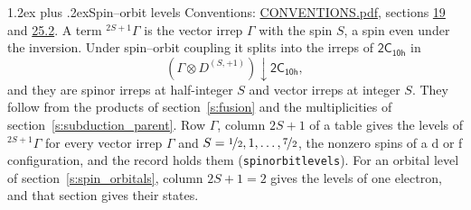 \documentclass[10pt,a4paper]{article}
\makeatletter
\renewcommand\section{\@startsection{section}{1}{\z@}{-3ex plus -1ex minus -.2ex}%
  {1.2ex plus .2ex}{\normalfont\large\sffamily\bfseries\color{parttitle}}}
\numberwithin{equation}{section}
\newcommand{\grp}[1]{\mathsf{#1}}
\newcommand{\restr}[2]{#1\!\downarrow#2}
\newcommand{\irrJp}[2]{D^{(#1,#2)}}
\newcommand{\irrprod}{\otimes}
\newcommand{\term}[2]{{}^{#1}#2}
\makeatother
\begin{document}
\section{Spin--orbit levels}\label{s:spin_orbit}
Conventions: \href{../../CONVENTIONS.pdf}{CONVENTIONS.pdf}, sections \href{../../../rotation/CONVENTIONS.pdf\#conv.19}{19} and \href{../../CONVENTIONS.pdf\#conv.25.2}{25.2}.
\leavevmode\label{n:local.spin}\label{n:symbol.term}A term $\term{2S+1}{\Gamma}$ is the vector irrep $\Gamma$ with the spin $S$, a spin even under the inversion. Under spin--orbit coupling it splits into the irreps of $\grp{2C_{10h}}$ in
\begin{equation}\label{e:spinorbit}\restr{(\Gamma \irrprod \irrJp{S}{+1})}{\grp{2C_{10h}}},\end{equation}
and they are spinor irreps at half-integer $S$ and vector irreps at integer $S$. They follow from the products of section~\ref{s:fusion} and the multiplicities of section~\ref{s:subduction_parent}. Row $\Gamma$, column $2S + 1$ of a table gives the levels of $\term{2S+1}{\Gamma}$ for every vector irrep $\Gamma$ and $S = \nicefrac{1}{2}, 1, \dots, \nicefrac{7}{2}$, the nonzero spins of a d or f configuration, and the record holds them (\texttt{spinorbitlevels}). For an orbital level of section~\ref{s:spin_orbitals}, column $2S + 1 = 2$ gives the levels of one electron, and that section gives their states.
\end{document}
